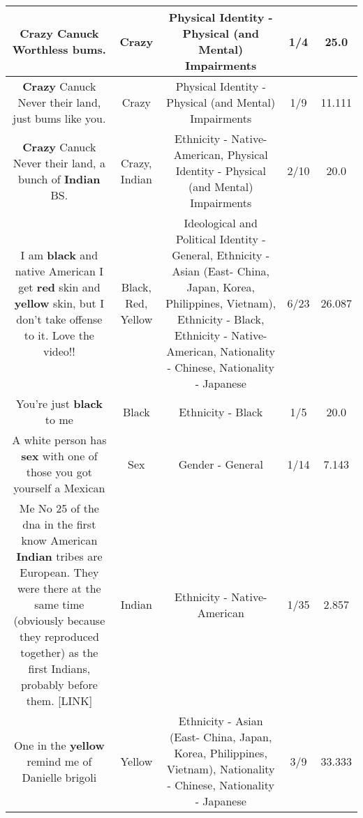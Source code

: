 \documentclass[11pt]{article}
\newlength\mylength
\begin{document}
\begin{center}
\begin{longtable}{|C{.65\mylength}|C{.30\mylength}|C{.12\mylength}|C{.12\mylength}|C{.12\mylength}|}
  \small \@\textbf{Crazy} Canuck Worthless bums.\normalsize   & Crazy & Physical Identity - Physical (and Mental) Impairments & 1/4 & 25.0 \\  \hline
  \small \@\textbf{Crazy} Canuck Never their land, just bums like you.\normalsize   & Crazy & Physical Identity - Physical (and Mental) Impairments & 1/9 & 11.111 \\  \hline
  \small \@\textbf{Crazy} Canuck Never their land, a bunch of \textbf{Indian} BS.\normalsize   & Crazy, Indian & Ethnicity - Native-American, Physical Identity - Physical (and Mental) Impairments & 2/10 & 20.0 \\  \hline
  \small I am \textbf{black} and native American I get \textbf{r\textbf{ed}} skin and \textbf{y\textbf{e\textbf{llow}}} skin, but I don't take offense to it. Love the video!!\normalsize   & Black, Red, Yellow &  Ideological and Political Identity - General, Ethnicity - Asian (East- China, Japan, Korea, Philippines, Vietnam), Ethnicity - Black, Ethnicity - Native-American, Nationality - Chinese, Nationality - Japanese & 6/23 & 26.087 \\  \hline
  \small You're just \textbf{black} to me\normalsize   & Black & Ethnicity - Black & 1/5 & 20.0 \\  \hline
  \small A white person has \textbf{sex} with one of those you got yourself a Mexican\normalsize   & Sex & Gender - General & 1/14 & 7.143 \\  \hline
  \small Me No 25 of the dna in the first know American \textbf{Indian} tribes are European. They were there at the same time (obviously because they reproduced together) as the first Indians, probably before them.  [LINK] \normalsize   & Indian & Ethnicity - Native-American & 1/35 & 2.857 \\  \hline
  \small One in the \textbf{y\textbf{e\textbf{llow}}} remind me of Danielle brigoli\normalsize   & Yellow & Ethnicity - Asian (East- China, Japan, Korea, Philippines, Vietnam), Nationality - Chinese, Nationality - Japanese & 3/9 & 33.333 \\  \hline

\end{longtable}
\end{center}
\end{document}
